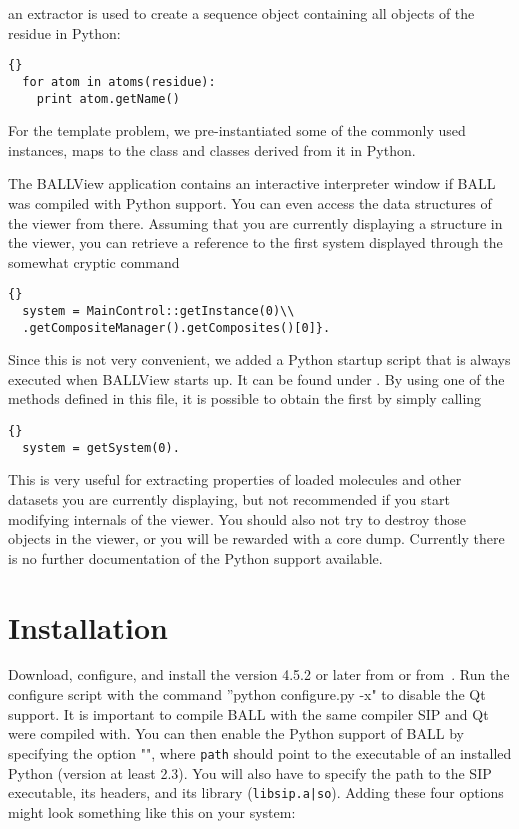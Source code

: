 \noindent
an  extractor is used to create a sequence object containing
all objects of the residue in Python:

\begin{lstlisting}{}
  for atom in atoms(residue):
    print atom.getName()
\end{lstlisting}

For the template problem, we pre-instantiated some of the 
commonly used instances, \eg {} maps to the 
 class and classes derived from it in Python.

The BALLView application contains an interactive interpreter window
if BALL was compiled with Python support. You can even access the
data structures of the viewer from there. Assuming that you are
currently displaying a structure in the viewer, you can retrieve a
reference to the first system displayed through the somewhat cryptic
command 

\begin{lstlisting}{}
  system = MainControl::getInstance(0)\\
  .getCompositeManager().getComposites()[0]}.
\end{lstlisting}

\noindent
Since this is not very convenient, we added a Python startup script that is 
always executed when \mbox{BALLView} starts up. It can be found under 
. By using one of the methods defined in this file,
it is possible to obtain the first  by simply calling

\begin{lstlisting}{}
  system = getSystem(0).
\end{lstlisting}

\noindent
This is very useful for extracting properties of loaded molecules and other 
datasets you are currently displaying, but not recommended if you start 
modifying internals of the viewer. You should also not try to destroy those 
objects in the viewer, or you will be rewarded with a core dump. Currently 
there is no further documentation of the Python support available.
		

\section{Installation}

Download, configure, and install the  version 4.5.2 or later from 
 or from~\cite{SIP}.
Run the configure script with the command ''python configure.py -x" to disable 
the Qt support. It is important to compile BALL with the same \CPP compiler SIP
and Qt were compiled with. You can then enable the Python support of BALL
by specifying the option \mbox{""}, where
{\tt path} should point to the executable of an installed Python (version at
least 2.3). You will also have to specify the path to the SIP executable, its
headers, and its library ({\tt libsip.a|so}). Adding these four options might
look something like this on your system:

